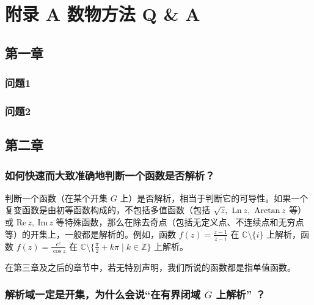 \documentclass[UTF8]{report}
\def\Im{\mathrm{Im\,}}
\def\Re{\mathrm{Re\,}}
\def\Ln{\mathrm{Ln\,}}
\def\Z{\mathbb{Z}}
\def\C{\mathbb{C}}
\theoremstyle{MyLineTheoremStyle} %
\theoremstyle{MyBlockTheoremStyle} %
\theoremstyle{MySubsubsectionStyle} %
\begin{document}
\chapter*{附录 A\hspace*{20pt}  数物方法 Q \& A}\setcounter{chapter}{20}   %
\thispagestyle{fancy} 
\setcounter{section}{0}   
\renewcommand\thesection{A.\arabic{section}}   
\renewcommand{\thefigure}{A.\arabic{figure}} 
\renewcommand{\thetable}{A.\arabic{table}}

\section{第一章}

\subsection{问题1}



\subsection{问题2}

\section{第二章}


\subsection{如何快速而大致准确地判断一个函数是否解析？}

判断一个函数（在某个开集 $G$ 上）是否解析，相当于判断它的可导性。如果一个复变函数是由初等函数构成的，不包括多值函数（包括 $\sqrt{z},\ \Ln z,\ \text{Arctan\,} z$ 等）或 $\Re z,\ \Im z$ 等特殊函数，那么在除去奇点（包括无定义点、不连续点和无穷点等）的开集上，一般都是解析的。例如，函数 $f(z) = \frac{z - 1}{z - i}$ 在 $\C \setminus \{i\}$ 上解析，函数 $f(z) = \frac{e^z}{\cos z}$ 在 $\C \setminus \{\frac{\pi}{2} + k\pi \mid k \in \Z \}$ 上解析。

在第三章及之后的章节中，若无特别声明，我们所说的函数都是指单值函数。

\subsection{解析域一定是开集，为什么会说“在有界闭域 $\overline{G} $ 上解析” ？}\label{在闭域上解析}
\end{document}
